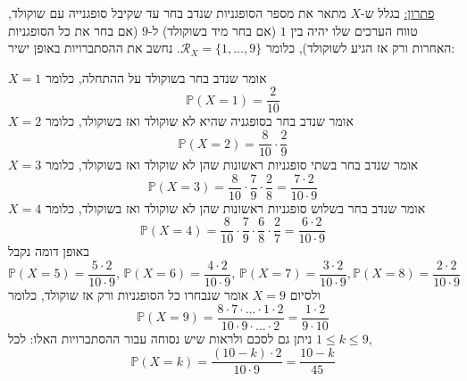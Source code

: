 \documentclass[12pt, a4paper]{article}
\newcommand{\cR}{\mathcal{R}}
\newcommand{\PP}{\mathbb{P}}
\begin{document}
\begin{enumerate}
\underline{פתרון:}
בגלל ש-$X$
מתאר את מספר הסופגניות שנדב בחר עד שקיבל סופגנייה עם שוקולד, טווח הערכים שלו יהיה בין
$1$
(אם בחר מיד בשוקולד)
ל-$9$
(אם בחר את כל הסופגניות האחרות ורק אז הגיע לשוקולד),
כלומר
$\cR_X=\{1,\ldots,9\}$.
נחשב את ההסתברויות באופן ישיר:

$X=1$
אומר שנדב בחר בשוקולד על ההתחלה, כלומר
$$\PP(X=1)=\frac{2}{10}$$
$X=2$
אומר שנדב בחר בסופגניה שהיא לא שוקולד ואז בשוקולד, כלומר
$$\PP(X=2)=\frac{8}{10}\cdot
\frac{2}{9}$$
$X=3$
אומר שנדב בחר בשתי סופגניות ראשונות שהן לא שוקולד ואז בשוקולד, כלומר
$$\PP(X=3)=\frac{8}{10}\cdot
\frac{7}{9}\cdot
\frac{2}{8}=\frac{7\cdot 2}{10\cdot 9}$$
$X=4$
אומר שנדב בחר בשלוש סופגניות ראשונות שהן לא שוקולד ואז בשוקולד, כלומר
$$\PP(X=4)=\frac{8}{10}\cdot
\frac{7}{9}\cdot \frac{6}{8}\cdot
\frac{2}{7}=\frac{6\cdot 2}{10\cdot 9}$$
באופן דומה נקבל
$$\PP(X=5)=\frac{5\cdot 2}{10\cdot 9},\,
\PP(X=6)=\frac{4\cdot 2}{10\cdot 9},\,
\PP(X=7)=\frac{3\cdot 2}{10\cdot 9},
\PP(X=8)=\frac{2\cdot 2}{10\cdot 9}$$
ולסיום
$X=9$
אומר שנבחרו כל הסופגניות ורק אז שוקולד, כלומר
$$\PP(X=9)=\frac{8\cdot7\cdot\ldots\cdot 1\cdot 2 }{10\cdot 9\cdot\ldots\cdot 2}=\frac{1\cdot 2}{9\cdot 10}$$
ניתן גם לסכם ולראות שיש נסוחה עבור ההסתברויות האלו: לכל
$1\le k\le 9$,
$$\boxed{\PP(X=k)}=\frac{(10-k)\cdot 2}{10\cdot 9}=
\boxed{\frac{10-k}{45}}$$

\end{enumerate}
\end{document}
